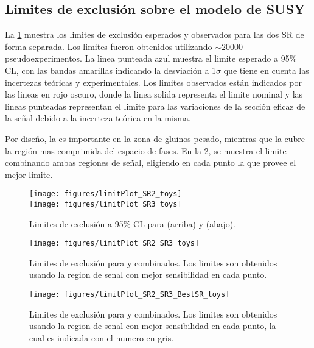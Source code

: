 \subsection{Limites de exclusión sobre el modelo de SUSY}

La \cref{fig:limit_SR_toys} muestra los limites de exclusión
esperados y observados para las dos SR de forma separada. Los limites
fueron obtenidos utilizando $\sim 20000$ pseudoexperimentos. La linea
punteada azul muestra el limite esperado a 95\% CL, con las bandas
amarillas indicando la desviación a 1$\sigma$ que tiene en cuenta
las incertezas teóricas y experimentales.
Los limites observados están indicados por las lineas en rojo oscuro,
donde la linea solida representa el limite nominal y las lineas
punteadas representan el limite para las variaciones de la sección
eficaz de la señal debido a la incerteza teórica en la misma.


Por diseño, la {\SRL} es importante en la zona de gluinos pesado,
mientras que la {\SRH} cubre la región mas comprimida del espacio
de fases. En la \cref{fig:limit_SR_combined_toys}, se muestra
el limite combinando ambas regiones de señal, eligiendo en cada punto
la que provee el mejor limite.


\begin{figure}[h!]
  \begin{center}
     \texttt{[image: figures/limitPlot\_SR2\_toys]} \\
     \vspace{1cm}
     \texttt{[image: figures/limitPlot\_SR3\_toys]}
     \caption{Limites de exclusión a 95\% CL para {\SRL}  (arriba) y {\SRH} (abajo).}
     \label{fig:limit_SR_toys}
  \end{center}
\end{figure}


\begin{figure}[h!]
  \begin{center}
     \texttt{[image: figures/limitPlot\_SR2\_SR3\_toys]} \\
     \caption{Limites de exclusión para {\SRL} y {\SRH} combinados.
       Los limites son obtenidos usando la region de senal con mejor sensibilidad
       en cada punto.}
     \label{fig:limit_SR_combined_toys}
  \end{center}
\end{figure}

\begin{figure}[h!]
  \begin{center}
     \texttt{[image: figures/limitPlot\_SR2\_SR3\_BestSR\_toys]}
     \caption{Limites de exclusión para {\SRL} y {\SRH} combinados.
       Los limites son obtenidos usando la region de senal con mejor sensibilidad
       en cada punto, la cual es indicada con el numero en gris.}
     \label{fig:limit_SR_combined_best}
  \end{center}
\end{figure}

